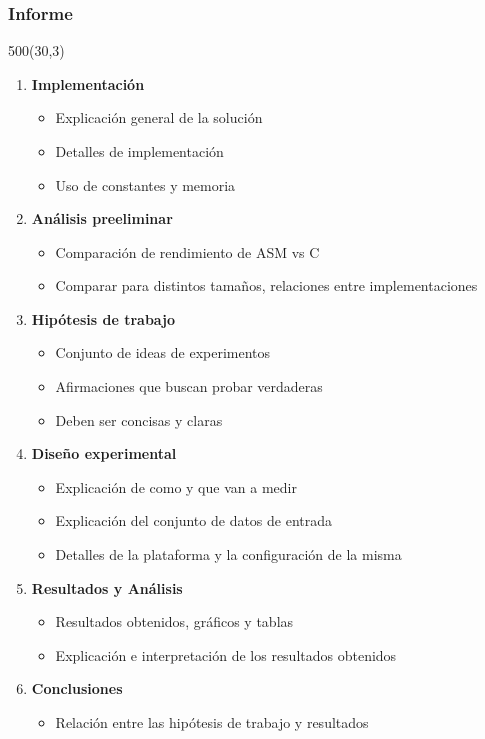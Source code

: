 \documentclass[aspectratio=169]{beamer}
\begin{document}
\begin{frame}[fragile]
    \frametitle{ \vspace{-1cm} \flushright \colorbox{verdeuca}{ \small \textcolor{white}{ \footnotesize \secname } }\\
    Informe}
    \begin{textblock}{500}(30,3)
        \scriptsize %
        \begin{enumerate}
        \item \textbf{Implementación}
        \begin{itemize} \scriptsize
        \item Explicación general de la solución
        \item Detalles de implementación
        \item Uso de constantes y memoria
        \end{itemize}
        \item \textbf{Análisis preeliminar}
        \begin{itemize} \scriptsize
        \item Comparación de rendimiento de ASM vs C
        \item Comparar para distintos tamaños, relaciones entre implementaciones
        \end{itemize}
        \item \textbf{Hipótesis de trabajo}
        \begin{itemize} \scriptsize
        \item Conjunto de ideas de experimentos
        \item Afirmaciones que buscan probar verdaderas
        \item Deben ser concisas y claras
        \end{itemize}
        \item \textbf{Diseño experimental}
        \begin{itemize} \scriptsize
        \item Explicación de como y que van a medir
        \item Explicación del conjunto de datos de entrada
        \item Detalles de la plataforma y la configuración de la misma
        \end{itemize}
        \item \textbf{Resultados y Análisis}
        \begin{itemize} \scriptsize
        \item Resultados obtenidos, gráficos y tablas
        \item Explicación e interpretación de los resultados obtenidos
        \end{itemize}
        \item \textbf{Conclusiones}
        \begin{itemize} \scriptsize
        \item Relación entre las hipótesis de trabajo y resultados
        \end{itemize}
        \end{enumerate}
    \end{textblock}
\end{frame}
\end{document}
